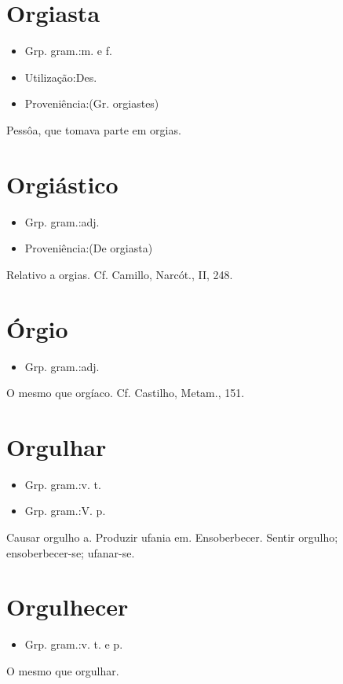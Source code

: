 \section{Orgiasta}
\begin{itemize}
\item {Grp. gram.:m.  e  f.}
\end{itemize}
\begin{itemize}
\item {Utilização:Des.}
\end{itemize}
\begin{itemize}
\item {Proveniência:(Gr. \textunderscore orgiastes\textunderscore )}
\end{itemize}
Pessôa, que tomava parte em orgias.
\section{Orgiástico}
\begin{itemize}
\item {Grp. gram.:adj.}
\end{itemize}
\begin{itemize}
\item {Proveniência:(De \textunderscore orgiasta\textunderscore )}
\end{itemize}
Relativo a orgias. Cf. Camillo, \textunderscore Narcót.\textunderscore , II, 248.
\section{Órgio}
\begin{itemize}
\item {Grp. gram.:adj.}
\end{itemize}
O mesmo que \textunderscore orgíaco\textunderscore . Cf. Castilho, \textunderscore Metam.\textunderscore , 151.
\section{Orgulhar}
\begin{itemize}
\item {Grp. gram.:v. t.}
\end{itemize}
\begin{itemize}
\item {Grp. gram.:V. p.}
\end{itemize}
Causar orgulho a.
Produzir ufania em.
Ensoberbecer.
Sentir orgulho; ensoberbecer-se; ufanar-se.
\section{Orgulhecer}
\begin{itemize}
\item {Grp. gram.:v. t.  e  p.}
\end{itemize}
O mesmo que \textunderscore orgulhar\textunderscore .

